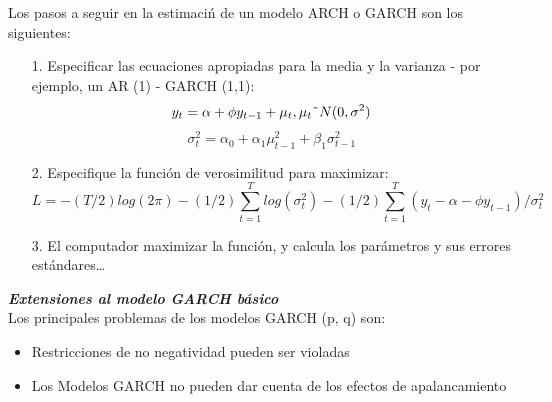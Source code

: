 	

	
	Los pasos a seguir en la estimaci\'n de un modelo ARCH o GARCH son los siguientes:\\
	\begin{itemize}
		\item [1.]Especificar las ecuaciones apropiadas para la media y la varianza - por ejemplo, un AR (1) - GARCH (1,1):\\
		
		\begin{equation}
		y_{t}=\alpha+\phi y_{t-1}+\mu_t, \mu_t \string~N(0,\sigma^2)
		\end{equation}
		\begin{equation}
		\sigma_{t}^{2}=\alpha_{0}+\alpha_{1}\mu_{t-1}^{2}+\beta_{1}\sigma_{t-1}^{2}
		\end{equation}
		\item [2.] Especifique la función de verosimilitud para maximizar:\\
		
		\begin{equation}
		L = - (T/2)log(2 \pi) - (1/2) \sum_{t=1}^{T} log(\sigma_{t}^{2}) - (1/2) \sum_{t=1}^{T} (y_t - \alpha-\phi y_{t-1})/\sigma_{t}^{2}
		\end{equation}
		\item [3.] El computador maximizar la funci\'on, y calcula los par\'ametros y sus errores est\'andares…\\
	\end{itemize}
	

\textit{\textbf{Extensiones al modelo GARCH b\'asico}}\\
		Los principales problemas de los modelos GARCH (p, q) son:\\
		\begin{itemize}
			\item Restricciones de no negatividad pueden ser violadas
			\item Los Modelos GARCH no pueden dar cuenta de los efectos de apalancamiento
		\end{itemize} 
		
